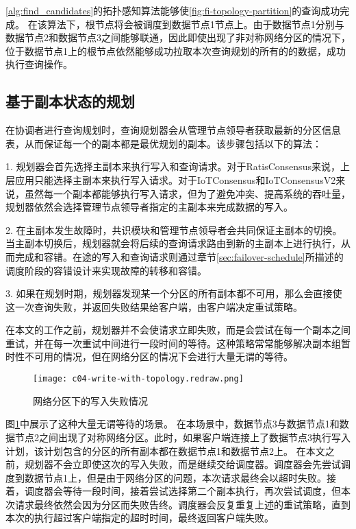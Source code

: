 \ref{alg:find_candidates}的拓扑感知算法能够使\ref{fig:fi-topology-partition}的查询成功完成。
在该算法下，根节点\fragmentinstance 将会被调度到数据节点1节点上。由于数据节点1分别与数据节点2和数据节点3之间能够联通，因此即使出现了非对称网络分区的情况下，位于数据节点1上的根节点\fragmentinstance 依然能够成功拉取本次查询规划的所有的\fragmentinstance 的数据，成功执行查询操作。


\subsection{基于副本状态的规划}

在协调者进行查询规划时，查询规划器会从管理节点领导者获取最新的分区信息表，从而保证每一个\fragmentinstance 的副本都是最优规划的副本。该步骤包括以下的算法：

1. 规划器会首先选择主副本来执行写入和查询请求。对于RatisConsensus来说，上层应用只能选择主副本来执行写入请求。对于IoTConsensus和IoTConsensusV2来说，虽然每一个副本都能够执行写入请求，但为了避免冲突、提高系统的吞吐量，规划器依然会选择管理节点领导者指定的主副本来完成数据的写入。

2. 在主副本发生故障时，共识模块和管理节点领导者会共同保证主副本的切换。当主副本切换后，规划器就会将后续的查询请求路由到新的主副本上进行执行，从而完成\failover 和容错。在途的写入和查询请求则通过章节\ref{sec:failover-schedule}所描述的调度阶段的容错设计来实现故障的转移和容错。

3. 如果在规划时期，规划器发现某一个分区的所有副本都不可用，那么会直接使这一次查询失败，并返回失败结果给客户端，由客户端决定重试策略。

在本文的工作之前，规划器并不会使请求立即失败，而是会尝试在每一个副本之间重试，并在每一次重试中间进行一段时间的等待。这种策略常常能够解决副本组暂时性不可用的情况，但在网络分区的情况下会进行大量无谓的等待。

\begin{figure}
  \centering
  \texttt{[image: c04-write-with-topology.redraw.png]}
  \caption{网络分区下的写入失败情况}
  \label{fig:c04-write-with-topology}
\end{figure}

图\ref{fig:c04-write-with-topology}中展示了这种大量无谓等待的场景。
在本场景中，数据节点3与数据节点1和数据节点2之间出现了对称网络分区。此时，如果客户端连接上了数据节点3执行写入计划，该计划包含的分区的所有副本都在数据节点1和数据节点2上。
在本文之前，规划器不会立即使这次的写入失败，而是继续交给调度器。调度器会先尝试调度到数据节点1上，但是由于网络分区的问题，本次请求最终会以超时失败。接着，调度器会等待一段时间，接着尝试选择第二个副本执行，再次尝试调度，但本次请求最终依然会因为分区而失败告终。调度器会反复重复上述的重试策略，直到本次的执行超过客户端指定的超时时间，最终返回客户端失败。

